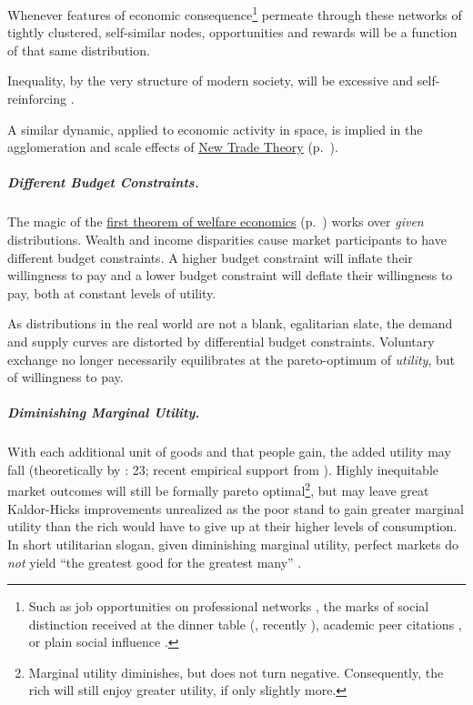 \begin{enumerate}
	Whenever features of economic consequence\footnote{
		Such as job opportunities on professional networks \citep{Benkler2006}, the marks of social distinction received at the dinner table (\citealt{Bourdieu-1984-aa}, recently \citealt{Hartmann2002}), academic peer citations \citep{Jackson1968, Merton1988}, or plain social influence \citep{Asch}.}
	permeate through these networks of tightly clustered, self-similar nodes, opportunities and rewards will be a function of that same distribution.

	Inequality, by the very structure of modern society, will be excessive and self-reinforcing \citep{Cozzi2009,Keller2005,Andriani2007}.

	A similar dynamic, applied to economic activity in space, is implied in the agglomeration and scale effects of \hyperref[sec:NTT]{New Trade Theory} (p.~\pageref{sec:NTT}).
\end{enumerate}

\subparagraph{Different Budget Constraints.}  \label{sec:differentbudgetconstraints} The magic of the \hyperref[fn:1sttheorem]{first theorem of welfare economics} (p.~\pageref{fn:1sttheorem}) works over \emph{given} distributions. Wealth and income disparities cause market participants to have different budget constraints. A higher budget constraint will inflate their willingness to pay and a lower budget constraint will deflate their willingness to pay, both at constant levels of utility.


As distributions in the real world are not a blank, egalitarian slate, the demand and supply curves are distorted by differential budget constraints. Voluntary exchange no longer necessarily equilibrates at the pareto-optimum of \emph{utility}, but of willingness to pay.

\subparagraph{Diminishing Marginal Utility.} \label{sec:diminishingmarginalutility} With each additional unit of goods and  that people gain, the added utility may fall (theoretically by \citealt{Lerner1944}: 23; recent empirical support from \citealt{Ng-1997-aa,Veenhoven-2000-aa,Nickell2008}). Highly inequitable market outcomes will still be formally pareto optimal\footnote{
	Marginal utility diminishes, but does not turn negative. Consequently, the rich will still enjoy greater utility, if only slightly more.},
but may leave great Kaldor-Hicks improvements unrealized as the poor stand to gain greater marginal utility than the rich would have to give up at their higher levels of consumption. In short utilitarian slogan, given diminishing marginal utility, perfect markets do \emph{not} yield ``the greatest good for the greatest many'' \citep{Mill1863}.

